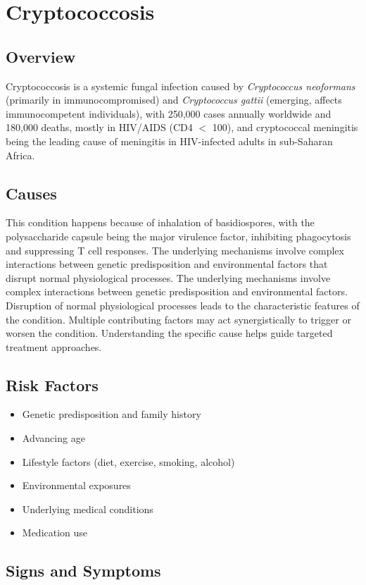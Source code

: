 \chapter{Cryptococcosis}
\label{sec:Cryptococcosis}

\section{Overview}
Cryptococcosis is a systemic fungal infection caused by \textit{Cryptococcus neoformans} (primarily in immunocompromised) and \textit{Cryptococcus gattii} (emerging, affects immunocompetent individuals), with 250,000 cases annually worldwide and 180,000 deaths, mostly in HIV/AIDS (CD4 $<$ 100), and cryptococcal meningitis being the leading cause of meningitis in HIV-infected adults in sub-Saharan Africa.
\section{Causes}
This condition happens because of inhalation of basidiospores, with the polysaccharide capsule being the major virulence factor, inhibiting phagocytosis and suppressing T cell responses. The underlying mechanisms involve complex interactions between genetic predisposition and environmental factors that disrupt normal physiological processes. The underlying mechanisms involve complex interactions between genetic predisposition and environmental factors. Disruption of normal physiological processes leads to the characteristic features of the condition. Multiple contributing factors may act synergistically to trigger or worsen the condition. Understanding the specific cause helps guide targeted treatment approaches.
\section{Risk Factors}


\begin{itemize}[noitemsep]
  \item Genetic predisposition and family history
  \item Advancing age
  \item Lifestyle factors (diet, exercise, smoking, alcohol)
  \item Environmental exposures
  \item Underlying medical conditions
  \item Medication use
\end{itemize}
\section{Signs and Symptoms}

